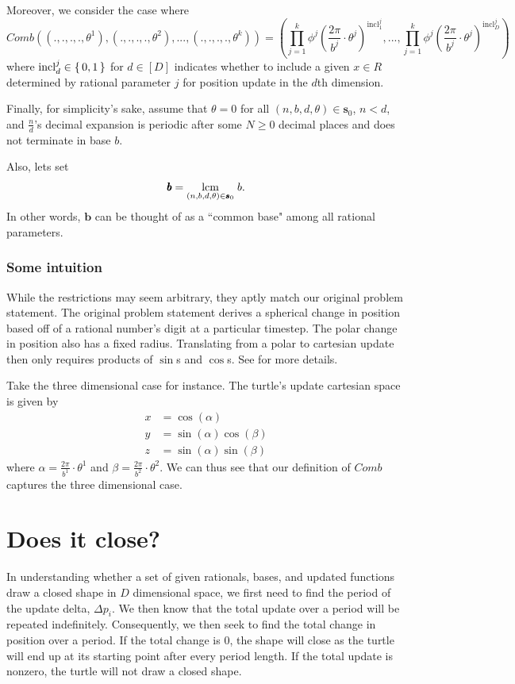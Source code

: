 \documentclass[11pt,titlepage]{article}
\newcommand{\comb}{Comb}
\newcommand{\inclIndic}[2]{{\mathrm{incl}_{#1}^{#2}}}
\newcommand{\numbToAngle}{\frac{2\pi}{b^j}}
\newcommand{\numbToAngleNoJ}[1]{\frac{2\pi}{b^{#1}}}
\newcommand{\commonBase}{{\pmb{b}}}
\newcommand{\sinOrCos}{\phi^j}
\newcommand{\combSingleTerm}[1]{\prod_{j=1}^k \sinOrCos\left(\numbToAngle \cdot \theta^j\right) ^ {\inclIndic{#1}{j}}}
\begin{document}
Moreover, we consider the case where
$$
  Comb((., ., ., ., \theta^1), (., ., ., ., \theta^2), ..., (., ., ., ., \theta^k)) =
    \left(\combSingleTerm{1}, ..., \combSingleTerm{D}\right)
$$
where $\mathrm{incl}_d^j \in \set{0, 1}$ for $d \in [D]$ indicates whether to include a given
$x \in R$ determined by rational parameter $j$ for position update in the $d$th dimension.

Finally, for simplicity's sake, assume that $\theta = 0$ for all $(n, b, d, \theta) \in \pmb{s}_0$,
$n < d$, and $\frac{n}{d}$'s decimal expansion is periodic after some $N \geq 0$ decimal places
and does not terminate in base $b$.

Also, lets set 
$$\commonBase = \lcm{(n, b, d, \theta) \in \pmb{s}_0} b.$$
In other words,
$\commonBase$ can be thought of as a ``common base" among all rational parameters.

\subsubsection{Some intuition}
While the restrictions may seem arbitrary, they aptly match our original problem statement.
The original problem statement derives a spherical change in position based off of a rational number's
digit at a particular timestep. The polar change in position also has a fixed radius. Translating
from a polar to cartesian update then only requires products of $\sin$s and $\cos$s. See \cite{NDimSphericalCoord}
for more details.

Take the three dimensional case for instance. The turtle's update cartesian space
is given by 
\begin{align*}
  x &= \cos(\alpha)\\
  y &= \sin(\alpha) \cos(\beta)\\
  z &= \sin(\alpha) \sin(\beta)
\end{align*}
where $\alpha = \numbToAngleNoJ{1} \cdot \theta^1$ and 
$\beta = \numbToAngleNoJ{2} \cdot \theta^2$. We can thus see that our definition
of $\comb$ captures the three dimensional case.




\section{Does it close?}
In understanding whether a set of given rationals, bases, and updated functions 
draw a closed shape in $D$ dimensional space, we first need to find the period of 
the update delta, $\Delta p_i$. We then know that the total update over a period will be repeated 
indefinitely. Consequently, we then seek to find the total change in position over a period. 
If the total change is $0$, the shape will close as the turtle will end up at its starting point
after every period length. If the total update is nonzero, the turtle will not draw a closed
shape.
\end{document}

